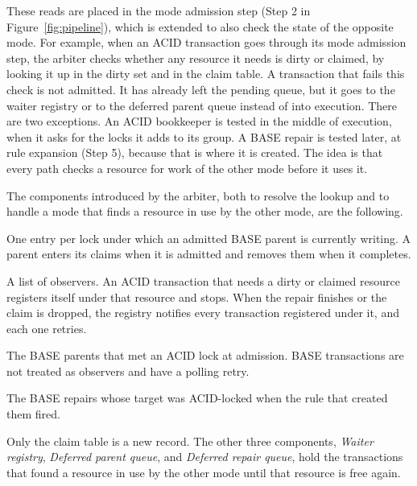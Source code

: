 These reads are placed in the mode admission step (Step 2 in
Figure~\ref{fig:pipeline}), which is extended to also check the state of the
opposite mode. For example, when an ACID transaction goes through its mode
admission step, the arbiter checks whether any resource it needs is dirty or
claimed, by looking it up in the dirty set and in the claim table. A
transaction that fails this check is not admitted. It has already left the
pending queue, but it goes to the waiter registry or to the deferred parent
queue instead of into execution. There are two exceptions. An ACID bookkeeper
is tested in the middle of execution, when it asks for the locks it adds to its
group. A BASE repair is tested later, at rule expansion (Step 5), because that
is where it is created. The
idea is that every path checks a resource for work of the other mode before
it uses it.

The components introduced by the arbiter, both to resolve the lookup and to
handle a mode that finds a resource in use by the other mode, are the
following.

\begin{bullets}
  \item[Claim table.]\label{sec:approach-claim-table} One entry per lock
  under which an admitted BASE parent is currently writing. A parent enters
  its claims when it is admitted and removes them when it completes.

  \item[Waiter registry.] A list of observers. An ACID transaction that needs
  a dirty or claimed resource registers itself under that resource and stops.
  When the repair finishes or the claim is dropped, the registry notifies
  every transaction registered under it, and each one retries.

  \item[Deferred parent queue.] The BASE parents that met an ACID lock at
  admission. BASE transactions are not treated as observers and have a polling
  retry.

  \item[Deferred repair queue.] The BASE repairs whose target was
  ACID-locked when the rule that created them fired.
\end{bullets}

Only the claim table is a new record. The other three components, \emph{Waiter
  registry}, \emph{Deferred parent queue}, and \emph{Deferred repair queue}, hold the
transactions that found a resource in use by the other mode until that resource
is free again.

